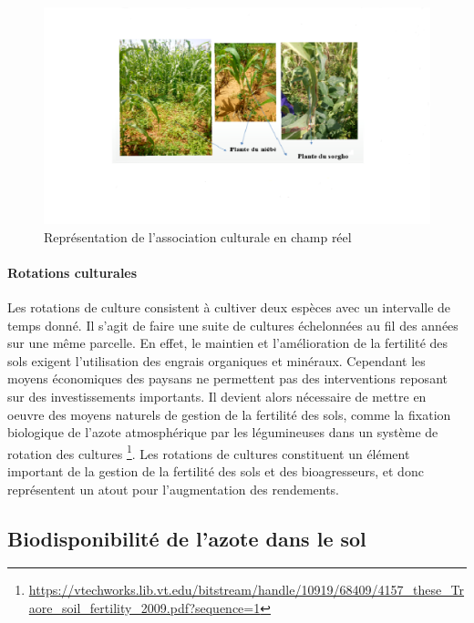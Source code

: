 \documentclass[a4paper,11pt]{article}
\begin{document}
\begin{figure}%
  \begin{center}
   \includegraphics[width=16cm]{images/AssociationChampReel}
\end{center}
\caption{Représentation de l'association culturale en champ réel}
\end{figure}

\paragraph{Rotations culturales}

Les rotations de culture consistent à cultiver deux espèces avec un
intervalle de temps donné. Il s'agit de faire une suite de cultures
échelonnées au fil des années sur une même parcelle. En effet, le
maintien et l’amélioration de la fertilité des sols exigent
l’utilisation des engrais organiques et minéraux. Cependant les moyens
économiques des paysans ne permettent pas des interventions reposant
sur des investissements importants. Il devient alors nécessaire de
mettre en oeuvre des moyens naturels de gestion de la fertilité des
sols, comme la fixation biologique de l’azote atmosphérique par les
légumineuses dans un système de rotation des cultures
\footnote{\url{https://vtechworks.lib.vt.edu/bitstream/handle/10919/68409/4157_these_Traore_soil_fertility_2009.pdf?sequence=1}}. Les rotations de cultures constituent un élément
important de la gestion de la fertilité des sols et des bioagresseurs,
et donc représentent un atout pour l’augmentation des rendements.



\subsection{Biodisponibilité de l’azote dans le sol}
\end{document}
